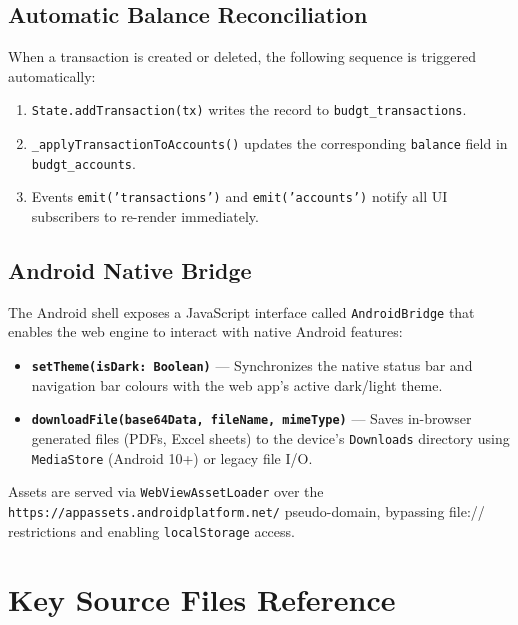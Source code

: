 \documentclass[12pt, a4paper]{article}
\begin{document}
\subsection{Automatic Balance Reconciliation}

When a transaction is created or deleted, the following sequence is triggered automatically:

\begin{enumerate}[leftmargin=1.5em]
  \item \texttt{State.addTransaction(tx)} writes the record to \texttt{budgt\_transactions}.
  \item \texttt{\_applyTransactionToAccounts()} updates the corresponding \texttt{balance} field in \texttt{budgt\_accounts}.
  \item Events \texttt{emit('transactions')} and \texttt{emit('accounts')} notify all UI subscribers to re-render immediately.
\end{enumerate}

\subsection{Android Native Bridge}

The Android shell exposes a JavaScript interface called \texttt{AndroidBridge} that enables the web engine to interact with native Android features:

\begin{itemize}[leftmargin=1.5em]
  \item \textbf{\texttt{setTheme(isDark: Boolean)}} --- Synchronizes the native status bar and navigation bar colours with the web app's active dark/light theme.
  \item \textbf{\texttt{downloadFile(base64Data, fileName, mimeType)}} --- Saves in-browser generated files (PDFs, Excel sheets) to the device's \texttt{Downloads} directory using \texttt{MediaStore} (Android 10+) or legacy file I/O.
\end{itemize}

Assets are served via \texttt{WebViewAssetLoader} over the \texttt{https://appassets.androidplatform.net/} pseudo-domain, bypassing file:// restrictions and enabling \texttt{localStorage} access.

\section{Key Source Files Reference}
\end{document}
